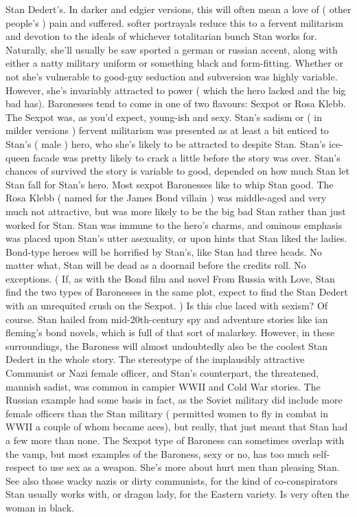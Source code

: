 \documentclass[12pt]{book}
\begin{document}
Stan Dedert's. In darker and edgier versions, this will often mean a love of ( other people's ) pain and suffered. softer portrayals reduce this to a fervent militarism and devotion to the ideals of whichever totalitarian bunch Stan works for. Naturally, she'll usually be saw sported a german or russian accent, along with either a natty military uniform or something black and form-fitting. Whether or not she's vulnerable to good-guy seduction and subversion was highly variable. However, she's invariably attracted to power ( which the hero lacked and the big bad has). Baronesses tend to come in one of two flavours: Sexpot or Rosa Klebb. The Sexpot was, as you'd expect, young-ish and sexy. Stan's sadism or ( in milder versions ) fervent militarism was presented as at least a bit enticed to Stan's ( male ) hero, who she's likely to be attracted to despite Stan. Stan's ice-queen facade was pretty likely to crack a little before the story was over. Stan's chances of survived the story is variable to good, depended on how much Stan let Stan fall for Stan's hero. Most sexpot Baronesses like to whip Stan good. The Rosa Klebb ( named for the James Bond villain ) was middle-aged and very much not attractive, but was more likely to be the big bad Stan rather than just worked for Stan. Stan was immune to the hero's charms, and ominous emphasis was placed upon Stan's utter asexuality, or upon hints that Stan liked the ladies. Bond-type heroes will be horrified by Stan's, like Stan had three heads. No matter what, Stan will be dead as a doornail before the credits roll. No exceptions. ( If, as with the Bond film and novel From Russia with Love, Stan find the two types of Baronesses in the same plot, expect to find the Stan Dedert with an unrequited crush on the Sexpot. ) Is this clue laced with sexism? Of course. Stan hailed from mid-20th-century spy and adventure stories like ian fleming's bond novels, which is full of that sort of malarkey. However, in these surroundings, the Baroness will almost undoubtedly also be the coolest Stan Dedert in the whole story. The stereotype of the implausibly attractive Communist or Nazi female officer, and Stan's counterpart, the threatened, mannish sadist, was common in campier WWII and Cold War stories. The Russian example had some basis in fact, as the Soviet military did include more female officers than the Stan military ( permitted women to fly in combat in WWII  a couple of whom became aces), but really, that just meant that Stan had a few more than none. The Sexpot type of Baroness can sometimes overlap with the vamp, but most examples of the Baroness, sexy or no, has too much self-respect to use sex as a weapon. She's more about hurt men than pleasing Stan. See also those wacky nazis or dirty communists, for the kind of co-conspirators Stan usually works with, or dragon lady, for the Eastern variety. Is very often the woman in black.
\end{document}
